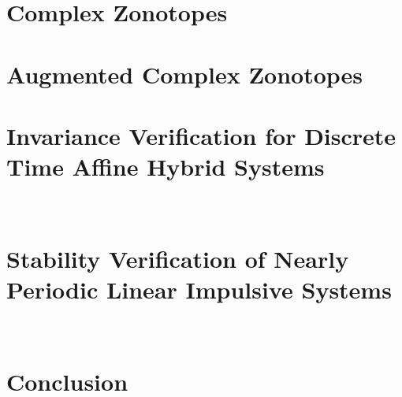 \documentclass[12pt,a4paper,twoside,openright]{book}
\begin{document}
\chapter{Complex Zonotopes} \label{ch:tcz} 
%
\chapter{Augmented Complex Zonotopes} \label{ch:acz} 
%
\chapter{Invariance Verification for Discrete Time Affine Hybrid Systems} ~\label{ch:invariance} 
%
\chapter{Stability Verification of Nearly Periodic Linear Impulsive Systems} ~\label{ch:lis} 
%
\chapter{Conclusion} \label{ch:conclusion} 
%  



{}




\end{document}
